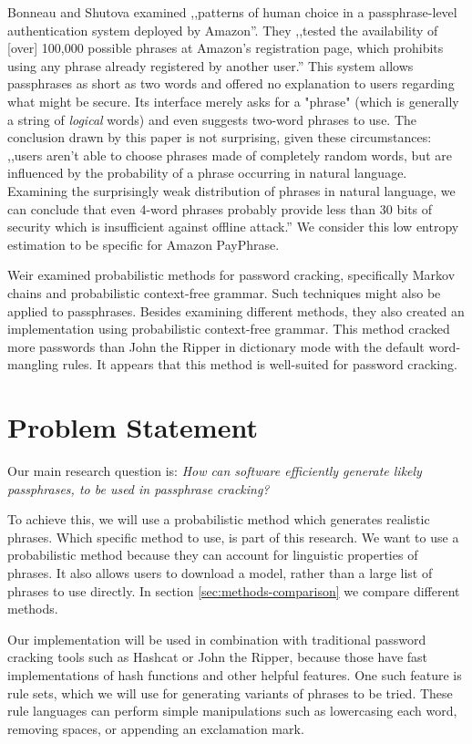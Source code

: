 \documentclass{article}
\begin{document}
Bonneau and Shutova\cite{payphrase-properties} examined ,,patterns of human
choice in a passphrase-level authentication system deployed by Amazon''. They
,,tested the availability of [over] 100,000 possible phrases at Amazon's
registration page, which prohibits using any phrase already registered by
another user.'' This system allows passphrases as short as two words and
offered no explanation to users regarding what might be secure. Its interface
merely asks for a "phrase" (which is generally a string of {\it logical} words)
and even suggests two-word phrases to use. The conclusion drawn by this paper
is not surprising, given these circumstances: ,,users aren't able to choose
phrases made of completely random words, but are influenced by the probability
of a phrase occurring in natural language. Examining the surprisingly weak
distribution of phrases in natural language, we can conclude that even 4-word
phrases probably provide less than 30 bits of security which is insufficient
against offline attack.'' We consider this low entropy estimation to be
specific for Amazon PayPhrase.

Weir\cite{weir} examined probabilistic methods for password cracking,
specifically Markov chains and probabilistic context-free grammar. Such
techniques might also be applied to passphrases. Besides examining different
methods, they also created an implementation using probabilistic context-free
grammar. This method cracked more passwords than John the Ripper in dictionary
mode with the default word-mangling rules. It appears that this method is
well-suited for password cracking.


\section{Problem Statement}\label{sec:problemstatement}

Our main research question is: {\it How can software efficiently generate
likely passphrases, to be used in passphrase cracking?}

To achieve this, we will use a probabilistic method which generates realistic
phrases. Which specific method to use, is part of this research. We want to use
a probabilistic method because they can account for linguistic properties of
phrases. It also allows users to download a model, rather than a large list of
phrases to use directly. In section \ref{sec:methods-comparison} we compare
different methods.

Our implementation will be used in combination with traditional password
cracking tools such as Hashcat or John the Ripper, because those have fast
implementations of hash functions and other helpful features. One such feature
is rule sets, which we will use for generating variants of phrases to be tried.
These rule languages can perform simple manipulations such as lowercasing each
word, removing spaces, or appending an exclamation mark.
\end{document}
